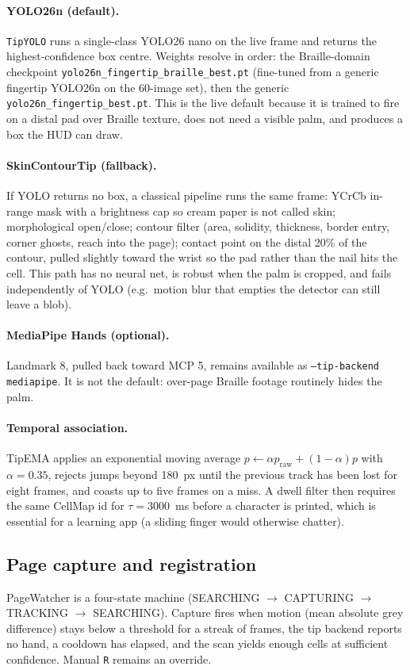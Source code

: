 \documentclass[conference]{IEEEtran}
\begin{document}
\paragraph{YOLO26n (default).}
\texttt{TipYOLO} runs a single-class YOLO26 nano on the live frame and
returns the highest-confidence box centre. Weights resolve in order:
the Braille-domain checkpoint
\texttt{yolo26n\_fingertip\_braille\_best.pt} (fine-tuned from a generic
fingertip YOLO26n on the 60-image set), then the generic
\texttt{yolo26n\_fingertip\_best.pt}. This is the live default because
it is trained to fire on a distal pad over Braille texture, does not
need a visible palm, and produces a box the HUD can draw.

\paragraph{SkinContourTip (fallback).}
If YOLO returns no box, a classical pipeline runs the same frame: YCrCb
in-range mask with a brightness cap so cream paper is not called skin;
morphological open/close; contour filter (area, solidity, thickness,
border entry, corner ghosts, reach into the page); contact point on the
distal 20\% of the contour, pulled slightly toward the wrist so the pad
rather than the nail hits the cell. This path has no neural net, is
robust when the palm is cropped, and fails independently of YOLO (e.g.\
motion blur that empties the detector can still leave a blob).

\paragraph{MediaPipe Hands (optional).}
Landmark 8, pulled back toward MCP 5, remains available as
\texttt{--tip-backend mediapipe}. It is not the default: over-page
Braille footage routinely hides the palm.

\paragraph{Temporal association.}
TipEMA applies an exponential moving average
$p \leftarrow \alpha p_{\mathrm{raw}} + (1-\alpha)p$ with $\alpha=0.35$,
rejects jumps beyond 180~px until the previous track has been lost for
eight frames, and coasts up to five frames on a miss. A dwell filter
then requires the same CellMap id for $\tau=3000$~ms before a character
is printed, which is essential for a learning app (a sliding finger
would otherwise chatter).

\subsection{Page capture and registration}
\label{sec:reg}
PageWatcher is a four-state machine (SEARCHING $\rightarrow$ CAPTURING
$\rightarrow$ TRACKING $\rightarrow$ SEARCHING). Capture fires when
motion (mean absolute grey difference) stays below a threshold for a
streak of frames, the tip backend reports no hand, a cooldown has
elapsed, and the scan yields enough cells at sufficient confidence.
Manual \texttt{R} remains an override.
\end{document}
